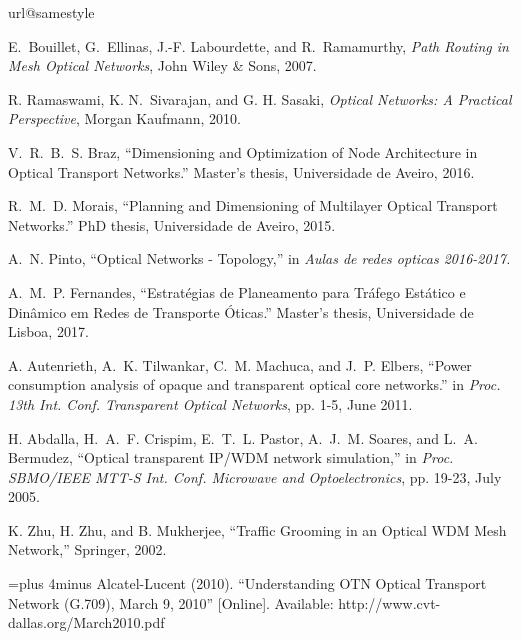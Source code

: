{}
%
\renewcommand{\bibname}{References}
%
%
%
%
\begin{thebibliography}{10}
\providecommand{\url}[1]{#1}
\csname url@samestyle\endcsname
\providecommand{\newblock}{\relax}
\providecommand{\bibinfo}[2]{#2}
\providecommand{\BIBentrySTDinterwordspacing}{\spaceskip=0pt\relax}
\providecommand{\BIBentryALTinterwordstretchfactor}{4}
\providecommand{\BIBentryALTinterwordspacing}{\spaceskip=\fontdimen2\font plus
\BIBentryALTinterwordstretchfactor\fontdimen3\font minus
  \fontdimen4\font\relax}
\providecommand{\BIBforeignlanguage}[2]{{%
\expandafter\ifx\csname l@#1\endcsname\relax
\typeout{** WARNING: IEEEtran.bst: No hyphenation pattern has been}%
\typeout{** loaded for the language `#1'. Using the pattern for}%
\typeout{** the default language instead.}%
\else
\language=\csname l@#1\endcsname
\fi
#2}}
\providecommand{\BIBdecl}{\relax}
\BIBdecl

E.~Bouillet, G.~Ellinas, J.-F. Labourdette, and R.~Ramamurthy, \emph{Path Routing in Mesh Optical Networks}, John Wiley \& Sons, 2007.

R. Ramaswami, K. N.~Sivarajan, and G. H. Sasaki, \emph{Optical Networks: A Practical Perspective}, Morgan Kaufmann, 2010.

V.~R.~B.~S. Braz, ``Dimensioning and Optimization of Node Architecture in Optical Transport Networks.'' Master's thesis, Universidade de Aveiro, 2016.

R.~M.~D. Morais, ``Planning and Dimensioning of Multilayer Optical Transport Networks.'' PhD thesis, Universidade de Aveiro, 2015.

A.~N. Pinto, ``Optical Networks - Topology,'' in \emph{Aulas de redes opticas 2016-2017.}

A.~M.~P. Fernandes, ``Estratégias de Planeamento para Tráfego Estático e Dinâmico em Redes de Transporte Óticas.'' Master's thesis, Universidade de Lisboa, 2017.

A. Autenrieth, A.~K. Tilwankar, C.~M. Machuca, and J.~P. Elbers, ``Power consumption analysis of opaque and transparent optical core networks.'' in \emph{Proc. 13th Int. Conf. Transparent Optical Networks}, pp. 1-5, June 2011.

H. Abdalla, H.~A.~F. Crispim, E.~T.~L. Pastor, A.~J.~M. Soares, and L.~A. Bermudez, ``Optical transparent IP/WDM network simulation,'' in \emph{Proc. SBMO/IEEE MTT-S Int. Conf. Microwave and Optoelectronics}, pp. 19-23, July 2005.

K. Zhu, H. Zhu, and B. Mukherjee, ``Traffic Grooming in an Optical WDM Mesh Network,'' Springer, 2002.

\BIBentryALTinterwordspacing
Alcatel-Lucent (2010). ``Understanding OTN Optical Transport Network (G.709), March 9, 2010'' [Online]. Available:
  \url{http://www.cvt-dallas.org/March2010.pdf}
\BIBentrySTDinterwordspacing

\end{thebibliography} 